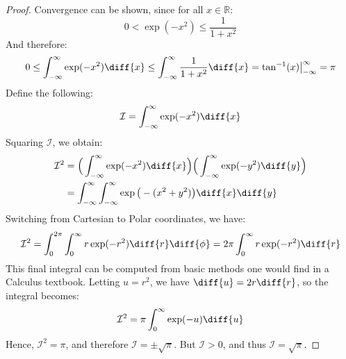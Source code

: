 \documentclass[crop=false,class=book,oneside]{standalone}
\begin{document}
            \begin{proof}
                Convergence can be shown, since for
                all $x\in\mathbb{R}$:
                \begin{equation}
                    0<\exp(-x^{2})\leq\frac{1}{1+x^2}
                \end{equation}
                And therefore:
                \begin{equation}
                    0\leq\int_{-\infty}^{\infty}
                    \exp(-x^{2})\diff{x}\leq
                    \int_{-\infty}^{\infty}
                    \frac{1}{1+x^2}\diff{x}
                    =\tan^{-1}(x)\big|_{-\infty}^{\infty}=\pi
                \end{equation}
                Define the following:
                \begin{equation}
                    \mathcal{I}=\int_{-\infty}^{\infty}
                    \exp(-x^{2})\diff{x}
                \end{equation}
                Squaring $\mathcal{I}$, we obtain:
                \begin{subequations}
                    \begin{align}
                        \mathcal{I}^{2}&=
                        \Big(\int_{-\infty}^{\infty}
                        \exp(-x^{2})\diff{x}\Big)
                        \Big(\int_{-\infty}^{\infty}
                        \exp(-y^{2})\diff{y}\Big)\\
                        &=\int_{-\infty}^{\infty}
                        \int_{-\infty}^{\infty}
                        \exp\big(-(x^2+y^2)\big)\diff{x}\diff{y}
                    \end{align}
                \end{subequations}
                Switching from Cartesian to
                Polar coordinates, we have:
                \begin{equation}
                    \mathcal{I}^{2}=
                    \int_{0}^{2\pi}\int_{0}^{\infty}
                    r\exp(-r^{2})\diff{r}\diff{\phi}=
                    2\pi \int_{0}^{\infty}
                    r\exp(-r^{2})\diff{r}
                \end{equation}
                This final integral can be computed from basic
                methods one would find in a Calculus textbook.
                Letting $u=r^{2}$, we have
                $\diff{u}=2r\diff{r}$,
                so the integral becomes:
                \begin{equation}
                    \mathcal{I}^{2}=
                    \pi\int_{0}^{\infty}\exp(-u)\diff{u}
                \end{equation}
                Hence, $\mathcal{I}^{2}=\pi$, and therefore
                $\mathcal{I}=\pm\sqrt{\pi}$.
                But $\mathcal{I} > 0$, and thus
                $\mathcal{I}=\sqrt{\pi}$.
            \end{proof}
\end{document}
